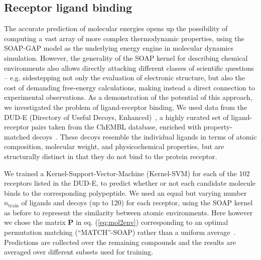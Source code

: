 \documentclass[12pt]{article}
\begin{document}
\subsection{Receptor ligand binding}

The accurate prediction of molecular energies opens up the possibility
of computing a vast array of more complex thermodynamic properties,
using the SOAP-GAP model as the underlying energy engine in molecular dynamics simulation.
However, the generality of the SOAP kernel for describing chemical environments
also allows directly attacking different classes of scientific
questions -- e.g. sidestepping not only the evaluation
of electronic structure, but also the cost of 
demanding free-energy calculations, making instead a direct connection
to experimental observations. 
As a demonstration of the potential of this approach, 
we  investigated the problem of ligand-receptor binding. 
We used data from the DUD-E (Directory of Useful 
Decoys, Enhanced)~\cite{mysinger_directory_2012}, a highly curated set of ligand-receptor 
pairs taken from the ChEMBL database, enriched with 
property-matched decoys~\cite{lagarde_benchmarking_2015}. These decoys resemble the 
individual ligands in terms of atomic composition, 
molecular weight, and physicochemical properties, but are 
structurally distinct in that they do not bind to the protein receptor.

We trained a Kernel-Support-Vector-Machine (Kernel-SVM)\cite{scho+98nc,scholkopf_learning_2002} for each of the 102 receptors listed in
the DUD-E, to predict whether or not each candidate molecule
binds to the corresponding polypeptide.
We used an equal but varying number $n_\textrm{train}$ of ligands and decoys (up to 120)
for each receptor, using the SOAP kernel as 
before to represent the similarity between atomic environments. Here 
however we chose the matrix $\mathbf{P}$ in eq. (\ref{eq:mol2env}) corresponding to
an optimal permutation matching (``MATCH''-SOAP) rather than a uniform average~\cite{de+16pccp}.
Predictions are collected over the remaining compounds and the results are averaged over different subsets used for training.
\end{document}

